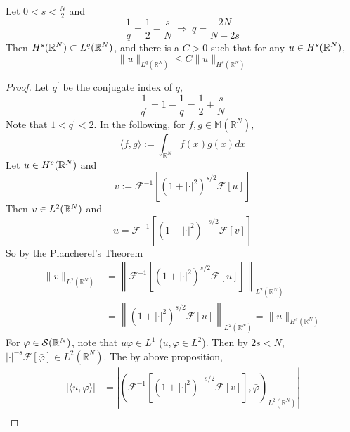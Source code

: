 \begin{thm}
	Let $0 < s < \frac{N}{2}$ and
	\begin{equation*}
		\frac{1}{q} = \frac{1}{2} - \frac{s}{N} ~\Rightarrow~q = \frac{2N}{N-2s}
	\end{equation*}
	Then $H^s(\mathbb{R}^N) \subset L^q(\mathbb{R}^N)$, and there is a $C > 0$ such that for any $u \in H^s(\mathbb{R}^N)$,
	\begin{equation*}
		\|u\|_{L^q\left(\mathbb{R}^N\right)} \leq C\|u\|_{H^s\left(\mathbb{R}^N\right)}
	\end{equation*}
\end{thm}
\begin{proof}
	Let $q^\prime$ be the conjugate index of $q$,
	\begin{equation*}
		\frac{1}{q^{\prime}}=1-\frac{1}{q}=\frac{1}{2}+\frac{s}{N} 
	\end{equation*}
	Note that $1 < q^\prime < 2$. In the following, for $f, g \in \mathbb{M}\left(\mathbb{R}^N\right)$,
	\begin{equation*}
		\langle f, g\rangle:=\int_{\mathbb{R}^N} f(x) g(x) d x
	\end{equation*}
	Let $u \in H^s(\mathbb{R}^N)$ and
	\begin{equation*}
		v:=\mathcal{F}^{-1}\left[\left(1+|\cdot|^2\right)^{s / 2} \mathcal{F}[u]\right]
	\end{equation*}
	Then $v \in L^2(\mathbb{R}^N)$ and
	\begin{equation*}
		u=\mathcal{F}^{-1}\left[\left(1+|\cdot|^2\right)^{-s / 2} \mathcal{F}[v]\right]
	\end{equation*}
	So by the Plancherel's Theorem
	\begin{equation*}
		\begin{aligned}
			\|v\|_{L^2\left(\mathbb{R}^N\right)} & =\left\|\mathcal{F}^{-1}\left[\left(1+|\cdot|^2\right)^{s / 2} \mathcal{F}[u]\right]\right\|_{L^2\left(\mathbb{R}^N\right)} \\
			& =\left\|\left(1+|\cdot|^2\right)^{s / 2} \mathcal{F}[u]\right\|_{L^2\left(\mathbb{R}^N\right)}=\|u\|_{H^s\left(\mathbb{R}^N\right)}
		\end{aligned}
	\end{equation*}
	For $\varphi \in \mathcal{S}(\mathbb{R}^N)$, note that $u\varphi \in L^1$ ($u,\varphi \in L^2$). Then by $2s < N$, $|\cdot|^{-s} \mathcal{F}[\bar{\varphi}] \in L^2\left(\mathbb{R}^N\right)$. The by above proposition,
	\begin{equation*}
		\begin{aligned}
			|\langle u, \varphi\rangle| & =\left|\left(\mathcal{F}^{-1}\left[\left(1+|\cdot|^2\right)^{-s / 2} \mathcal{F}[v]\right], \bar{\varphi}\right)_{L^2\left(\mathbb{R}^N\right)}\right| \\

\end{aligned}
\end{equation*}
\end{proof}

